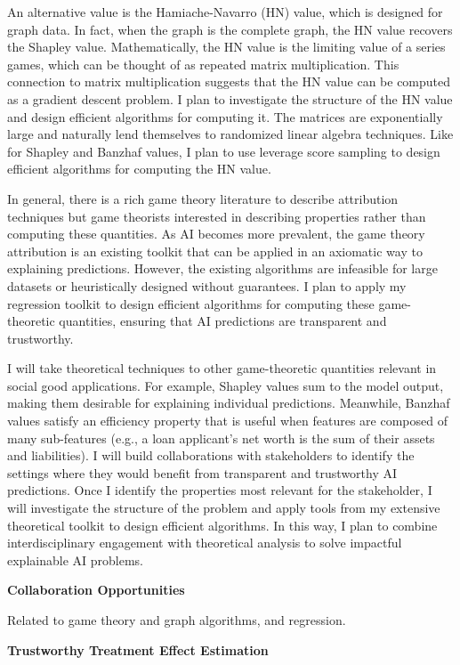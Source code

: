 \documentclass[11pt]{article}
\begin{document}
{An alternative value is the Hamiache-Navarro (HN) value, which is designed for graph data.
In fact, when the graph is the complete graph, the HN value recovers the Shapley value.
Mathematically, the HN value is the limiting value of a series games, which can be thought of as repeated matrix multiplication.
This connection to matrix multiplication suggests that the HN value can be computed as a gradient descent problem.
I plan to investigate the structure of the HN value and design efficient algorithms for computing it.
The matrices are exponentially large and naturally lend themselves to randomized linear algebra techniques.
Like for Shapley and Banzhaf values, I plan to use leverage score sampling to design efficient algorithms for computing the HN value.

In general, there is a rich game theory literature to describe attribution techniques but game theorists interested in describing properties rather than computing these quantities.
As AI becomes more prevalent, the game theory attribution is an existing toolkit that can be applied in an axiomatic way to explaining predictions.
However, the existing algorithms are infeasible for large datasets or heuristically designed without guarantees.
I plan to apply my regression toolkit to design efficient algorithms for computing these game-theoretic quantities, ensuring that AI predictions are transparent and trustworthy.

I will take theoretical techniques to other game-theoretic quantities relevant in social good applications.
For example, Shapley values sum to the model output, making them desirable for explaining individual predictions.
Meanwhile, Banzhaf values satisfy an efficiency property that is useful when features are composed of many sub-features (e.g., a loan applicant's net worth is the sum of their assets and liabilities).
I will build collaborations with stakeholders to identify the settings where they would benefit from transparent and trustworthy AI predictions.
Once I identify the properties most relevant for the stakeholder, I will investigate the structure of the problem and apply tools from my extensive theoretical toolkit to design efficient algorithms.
In this way, I plan to combine interdisciplinary engagement with theoretical analysis to solve impactful explainable AI problems.

{ \large \textbf{Collaboration Opportunities}}

Related to game theory and graph algorithms, and regression.

\begin{center}
    { \large \textbf{Trustworthy Treatment Effect Estimation}}    
\end{center}

}
\end{document}
